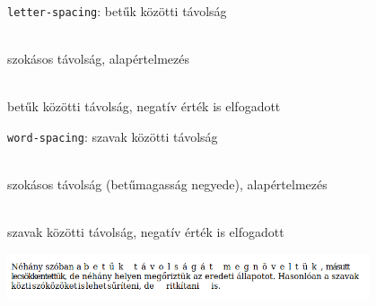 \begin{frame}
  \texttt{letter-spacing}: betűk közötti távolság
  \begin{description}[m]
    \item[\texttt{normal}] \hfill \\ szokásos távolság, alapértelmezés
    \item[\emph{távolság}] \hfill \\ betűk közötti távolság, negatív érték is elfogadott
  \end{description}
  \vfill
  \texttt{word-spacing}: szavak közötti távolság
  \begin{description}[m]
    \item[\texttt{normal}] \hfill \\ szokásos távolság (betűmagasság negyede), alapértelmezés
    \item[\emph{távolság}] \hfill \\ szavak közötti távolság, negatív érték is elfogadott
  \end{description}
\end{frame}

\begin{frame}
  \begin{exampleblock}{}
    \footnotesize
    
    
  \end{exampleblock}
  \begin{center}
    \includegraphics[width=0.8\textwidth]{tavolsag.png}
  \end{center}
\end{frame}
